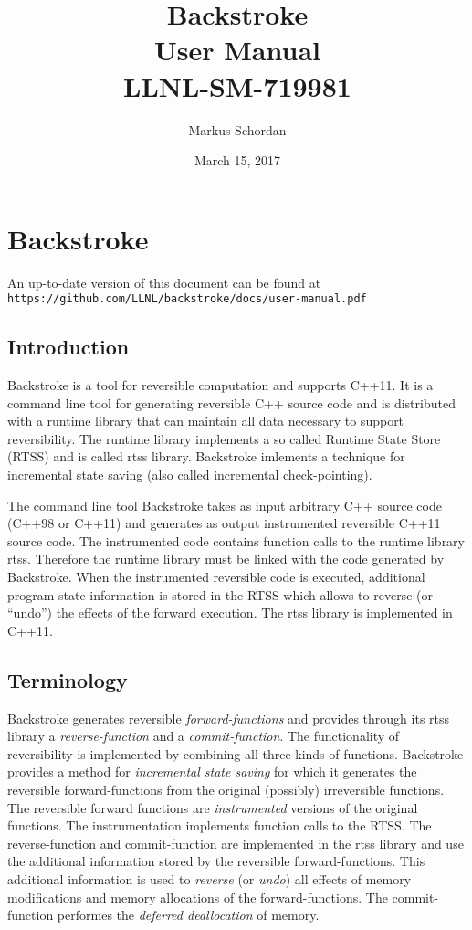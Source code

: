 \documentclass[english,12pt, titlepage]{article}      %
\title{Backstroke \bslongversion\\User Manual\\{\footnotesize LLNL-SM-719981}}  %
\author{Markus Schordan} %
\date{March 15, 2017} %
\newcommand{\forwardfunctions}{forward-functions}
\newcommand{\reversefunction}{reverse-function}
\newcommand{\commitfunction}{commit-function}
\begin{document}
\maketitle
\tableofcontents        
\afterpage{\clearpage}

\section{Backstroke}

An up-to-date version of this document can be found at
{\small \verb+https://github.com/LLNL/backstroke/docs/user-manual.pdf+}

\subsection{Introduction}
Backstroke is a tool for reversible computation and supports C++11. It
is a command line tool for generating reversible C++ source code and
is distributed with a runtime library that can maintain all data
necessary to support reversibility. The runtime library implements a
so called Runtime State Store (RTSS) and is called rtss
library. Backstroke imlements a technique for incremental state saving
(also called incremental check-pointing).

The command line tool Backstroke takes as input arbitrary C++ source
code (C++98 or C++11) and generates as output instrumented reversible
C++11 source code. The instrumented code contains function calls to
the runtime library rtss. Therefore the runtime library must be linked
with the code generated by Backstroke. When the instrumented
reversible code is executed, additional program state information is
stored in the RTSS which allows to reverse (or ``undo'') the effects
of the forward execution. The rtss library is implemented in C++11.

\subsection{Terminology}

Backstroke generates reversible {\em \forwardfunctions{}} and provides
through its rtss library a {\em \reversefunction{}} and a {\em
  \commitfunction}. The functionality of reversibility is implemented
by combining all three kinds of functions. Backstroke provides a
method for {\em incremental state saving} for which it generates the
reversible \forwardfunctions{} from the original (possibly)
irreversible functions. The reversible forward functions are {\em
  instrumented} versions of the original functions. The
instrumentation implements function calls to the RTSS. The
\reversefunction{} and \commitfunction{} are implemented in the rtss
library and use the additional information stored by the reversible
\forwardfunctions. This additional information is used to {\em
  reverse} (or {\em undo}) all effects of memory modifications and
memory allocations of the \forwardfunctions. The commit-function
performes the {\em deferred deallocation} of memory.
\end{document}
